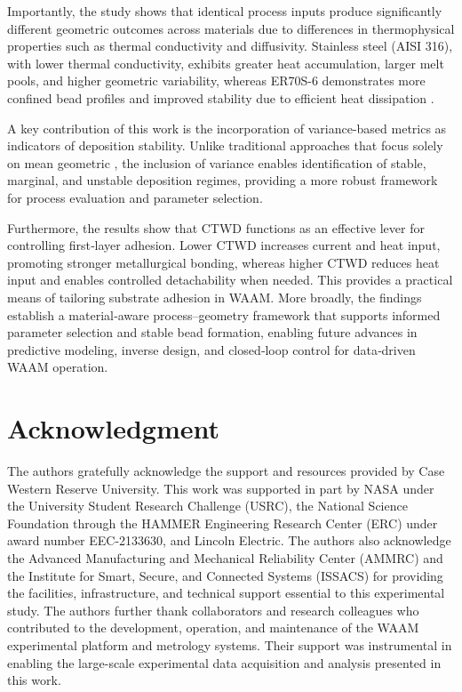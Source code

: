 \documentclass[conference]{IEEEtran}
\begin{document}
Importantly, the study shows that identical process inputs produce significantly different geometric outcomes across materials due to differences in thermophysical properties such as thermal conductivity and diffusivity. Stainless steel (AISI 316), with lower thermal conductivity, exhibits greater heat accumulation, larger melt pools, and higher geometric variability, whereas ER70S-6 demonstrates more confined bead profiles and improved stability due to efficient heat dissipation \cite{fouad2025,mulpur2026}. 

A key contribution of this work is the incorporation of variance-based metrics as indicators of deposition stability. Unlike traditional approaches that focus solely on mean geometric  \cite{Franke2025JIM,Kim2025WAAMVID}, the inclusion of variance enables identification of stable, marginal, and unstable deposition regimes, providing a more robust framework for process evaluation and parameter selection. 

Furthermore, the results show that CTWD functions as an effective lever for controlling first‑layer adhesion. Lower CTWD increases current and heat input, promoting stronger metallurgical bonding, whereas higher CTWD reduces heat input and enables controlled detachability when needed. This provides a practical means of tailoring substrate adhesion in WAAM. More broadly, the findings establish a material‑aware process–geometry framework that supports informed parameter selection and stable bead formation, enabling future advances in predictive modeling, inverse design, and closed‑loop control for data‑driven WAAM operation.

\section*{Acknowledgment}
The authors gratefully acknowledge the support and resources provided by Case Western Reserve University. This work was supported in part by NASA under the University Student Research Challenge (USRC), the National Science Foundation through the HAMMER Engineering Research Center (ERC) under award number EEC-2133630, and Lincoln Electric. The authors also acknowledge the Advanced Manufacturing and Mechanical Reliability Center (AMMRC) and the Institute for Smart, Secure, and Connected Systems (ISSACS) for providing the facilities, infrastructure, and technical support essential to this experimental study.  The authors further thank collaborators and research colleagues who contributed to the development, operation, and maintenance of the WAAM experimental platform and metrology systems. Their support was instrumental in enabling the large-scale experimental data acquisition and analysis presented in this work.
\end{document}
